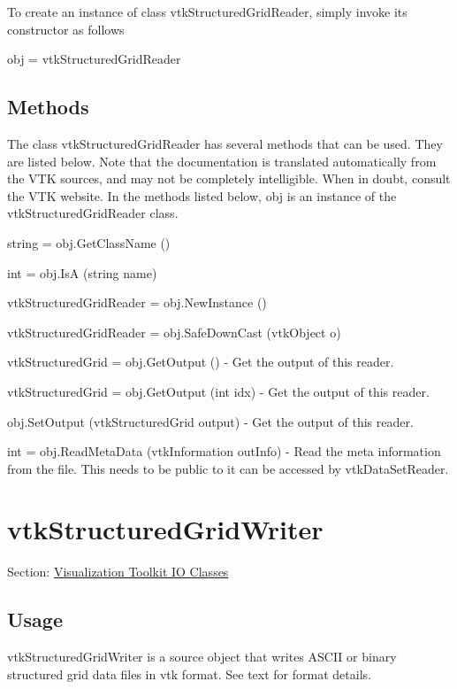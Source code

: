 To create an instance of class vtk\-Structured\-Grid\-Reader, simply invoke its constructor as follows \begin{DoxyVerb}  obj = vtkStructuredGridReader
\end{DoxyVerb}
 \hypertarget{vtkwidgets_vtkxyplotwidget_Methods}{}\subsection{Methods}\label{vtkwidgets_vtkxyplotwidget_Methods}
The class vtk\-Structured\-Grid\-Reader has several methods that can be used. They are listed below. Note that the documentation is translated automatically from the V\-T\-K sources, and may not be completely intelligible. When in doubt, consult the V\-T\-K website. In the methods listed below, {\ttfamily obj} is an instance of the vtk\-Structured\-Grid\-Reader class. 
\begin{DoxyItemize}
\item {\ttfamily string = obj.\-Get\-Class\-Name ()}  
\item {\ttfamily int = obj.\-Is\-A (string name)}  
\item {\ttfamily vtk\-Structured\-Grid\-Reader = obj.\-New\-Instance ()}  
\item {\ttfamily vtk\-Structured\-Grid\-Reader = obj.\-Safe\-Down\-Cast (vtk\-Object o)}  
\item {\ttfamily vtk\-Structured\-Grid = obj.\-Get\-Output ()} -\/ Get the output of this reader.  
\item {\ttfamily vtk\-Structured\-Grid = obj.\-Get\-Output (int idx)} -\/ Get the output of this reader.  
\item {\ttfamily obj.\-Set\-Output (vtk\-Structured\-Grid output)} -\/ Get the output of this reader.  
\item {\ttfamily int = obj.\-Read\-Meta\-Data (vtk\-Information out\-Info)} -\/ Read the meta information from the file. This needs to be public to it can be accessed by vtk\-Data\-Set\-Reader.  
\end{DoxyItemize}\hypertarget{vtkio_vtkstructuredgridwriter}{}\section{vtk\-Structured\-Grid\-Writer}\label{vtkio_vtkstructuredgridwriter}
Section\-: \hyperlink{sec_vtkio}{Visualization Toolkit I\-O Classes} \hypertarget{vtkwidgets_vtkxyplotwidget_Usage}{}\subsection{Usage}\label{vtkwidgets_vtkxyplotwidget_Usage}
vtk\-Structured\-Grid\-Writer is a source object that writes A\-S\-C\-I\-I or binary structured grid data files in vtk format. See text for format details.

